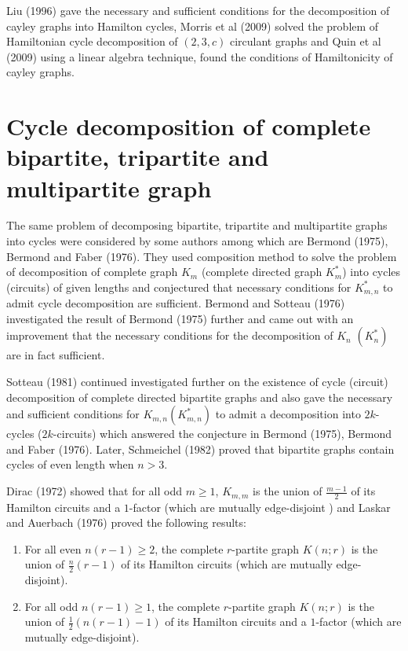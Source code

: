 \documentclass[12pt]{report}
\newcommand{\ben}{\begin{enumerate}}
\newcommand{\een}{\end{enumerate}}
\begin{document}
Liu (1996) %
 gave the necessary and sufficient conditions
for the decomposition of cayley graphs into Hamilton cycles, Morris
 et al (2009) %
solved the problem of Hamiltonian cycle decomposition of $(2,3,c)$
circulant graphs and Quin  et al (2009) %
using a linear algebra technique, found the conditions of
Hamiltonicity of cayley graphs.

\section{\protect\smallskip Cycle decomposition of complete bipartite, tripartite and multipartite graph}

The same problem of decomposing  bipartite, tripartite and
multipartite graphs into cycles were considered by some authors
among which are
 Bermond (1975), %
 Bermond  and Faber (1976). They %
 used composition method to solve the problem of  decomposition  of complete graph $K_m$ (complete directed graph $K_m^*$) into cycles (circuits) of given lengths and conjectured that necessary conditions for $K_{m,n}^*$ to admit cycle decomposition are sufficient.
 Bermond and Sotteau  (1976) %
 investigated the result of Bermond (1975) %
 further and came out with an improvement that the necessary conditions for the decomposition of $K_n$ $(K_n^*)$ are in fact sufficient.

Sotteau (1981) %
continued investigated further on the existence of cycle (circuit)
decomposition of complete directed bipartite graphs and also gave
the necessary and sufficient conditions for  $K_{m,n} (K_{m,n}^*)$
to admit a decomposition into $2k$-cycles ($2k$-circuits) which
answered the
conjecture in Bermond (1975),  %
 Bermond  and Faber (1976).  %
Later, Schmeichel (1982) %
 proved that bipartite graphs
contain cycles of even length when $n>3$.

Dirac (1972) %
showed that for all odd $m\geq 1$, $K_{m,m}$ is the union of
$\frac{m-1}{2}$ of its Hamilton circuits and a
$1$-factor (which are mutually edge-disjoint ) and Laskar and Auerbach (1976) %
proved the following results:
 \ben
\item For all even $n(r-1)\geq 2$, the complete $r$-partite graph $K(n;r)$ is the union of $\frac{n}{2}(r-1)$ of its Hamilton circuits (which are mutually edge-disjoint).
    \item For all odd $n(r-1)\geq 1$, the complete $r$-partite graph  $K(n;r)$ is the union of $\frac{1}{2}(n(r-1)-1)$ of its Hamilton  circuits and a $1$-factor  (which are mutually edge-disjoint).
\een
\end{document}
